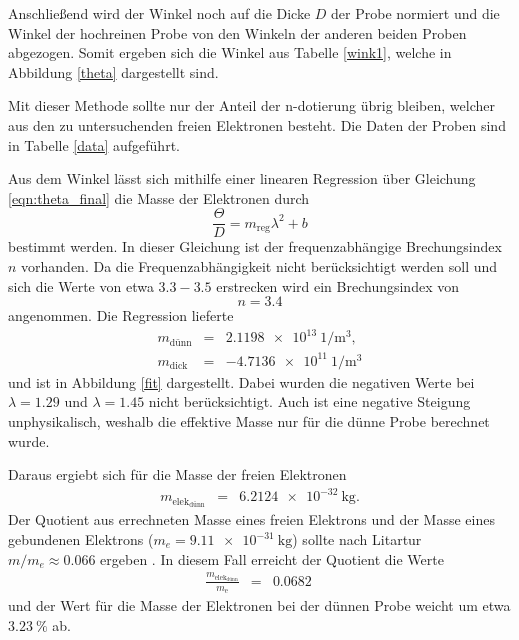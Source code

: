 Anschließend wird der Winkel noch auf die Dicke $D$ der Probe normiert und die Winkel der hochreinen Probe von den Winkeln der anderen beiden Proben abgezogen.
Somit ergeben sich die Winkel aus Tabelle \ref{wink1}, welche in Abbildung \ref{theta} dargestellt sind.

Mit dieser Methode sollte nur der Anteil der n-dotierung übrig bleiben, welcher aus den zu untersuchenden freien Elektronen besteht.
Die Daten der Proben sind in Tabelle \ref{data} aufgeführt.

Aus dem Winkel lässt sich mithilfe einer linearen Regression über Gleichung \eqref{eqn:theta_final} die Masse der Elektronen durch
\begin{equation*}
	\frac{\Theta}{D} = m_\text{reg} \lambda^2 + b
\end{equation*}
bestimmt werden.
In dieser Gleichung ist der frequenzabhängige Brechungsindex $n$ vorhanden. Da die Frequenzabhängigkeit nicht berücksichtigt werden soll und sich die Werte von etwa $3.3-3.5$ \cite{GeAs} erstrecken wird ein Brechungsindex von 
\begin{equation*}
	n = 3.4
\end{equation*}
angenommen.
Die Regression lieferte 
\begin{eqnarray*}
	m_\text{dünn} &=& \SI{ 2.1198e13}{1\per\meter^3},\\
	m_\text{dick} &=& \SI{-4.7136e11}{1\per\meter^3}
\end{eqnarray*}
und ist in Abbildung \ref{fit} dargestellt.
Dabei wurden die negativen Werte bei $\lambda = \num{1.29}$ und $\lambda = \num{1.45}$ nicht berücksichtigt.
Auch ist eine negative Steigung unphysikalisch, weshalb die effektive Masse nur für die dünne Probe berechnet wurde.

Daraus ergiebt sich für die Masse der freien Elektronen
\begin{eqnarray*}
	m_{\text{elek}_\text{dünn}} &=& \SI{6.2124e-32}{\kilogram}.
\end{eqnarray*}
Der Quotient aus errechneten Masse eines freien Elektrons und der Masse eines gebundenen Elektrons ($m_e = \SI{9.11e-31}{\kilogram}$) sollte nach Litartur $m/m_e \approx 0.066$ ergeben \cite{kittel}.
In diesem Fall erreicht der Quotient die Werte
\begin{eqnarray*}
	\frac{m_{\text{elek}_\text{dünn}}}{m_\text{e}} &=& \SI{0.0682}{}
\end{eqnarray*}
und der Wert für die Masse der Elektronen bei der dünnen Probe weicht um etwa $\SI{3.23}{\percent}$ ab.

